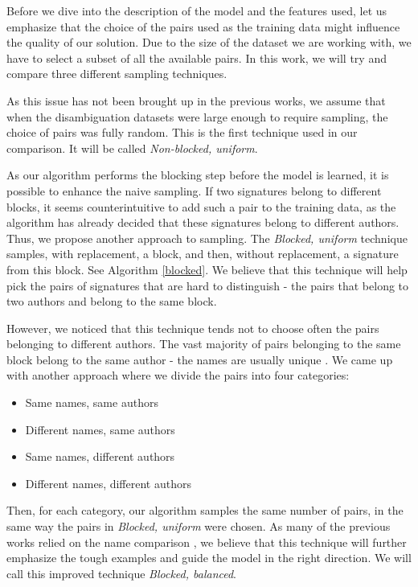 \documentclass{pracamgr}
\begin{document}
Before we dive into the description of the model and the features used, let us emphasize
that the choice of the pairs used as the training data might influence the quality of
our solution. Due to the size of the dataset we are working with, we have to select a
subset of all the available pairs. In this work, we will try and compare three different 
sampling techniques.

As this issue has not been brought up in the previous works, we assume that when the
disambiguation datasets were large enough to require sampling, the choice  of pairs
was fully random. This is the first technique used in our comparison. It will
be called \textit{Non-blocked, uniform}.

As our algorithm performs the blocking step before the model is learned, it is possible
to enhance the naive sampling. If two signatures belong to different blocks, it seems
counterintuitive to add such a pair to the training data, as the algorithm has already
decided that these signatures belong to different authors. Thus, we propose another
approach to sampling. The \textit{Blocked, uniform} technique samples, with replacement,
a block, and then, without replacement, a signature from this block. See Algorithm
\ref{blocked}. We believe that this technique will help pick the 
pairs of signatures that are hard to distinguish - the pairs that belong to two authors 
and belong to the same block.

However, we noticed that this technique tends not to choose often the pairs belonging to
different authors. The vast majority of pairs belonging to the same block belong to the
same author - the names are usually unique \citep{lange2011frequency}. We came up with
another approach where we divide the pairs into four categories:

\begin{itemize}
\item{Same names, same authors}
\item{Different names, same authors}
\item{Same names, different authors}
\item{Different names, different authors}
\end{itemize}

Then, for each category, our algorithm samples the same number of pairs, in the same way
the pairs in \textit{Blocked, uniform} were chosen. As many of the previous works relied
on the name comparison \citep{Ferreira:survey}, we believe that this technique will
further emphasize the tough examples and guide the model in the right direction. We
will call this improved technique \textit{Blocked, balanced}.
\end{document}
